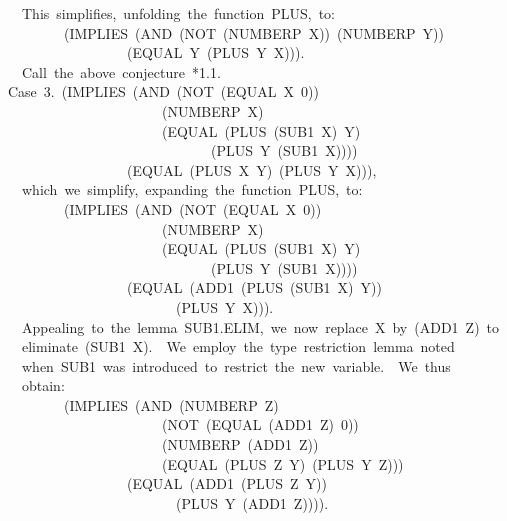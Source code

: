 \documentclass[11pt]{book}
\newenvironment{pubasis}{\begin{flushleft}\ttfamily\small}{\normalsize\rmfamily\end{flushleft}}
\begin{document}
\begin{pubasis}
~~This~simplifies,~unfolding~the~function~PLUS,~to:\\

~~~~~~~~(IMPLIES~(AND~(NOT~(NUMBERP~X))~(NUMBERP~Y))\\
~~~~~~~~~~~~~~~~~(EQUAL~Y~(PLUS~Y~X))).\\

~~Call~the~above~conjecture~*1.1.\\

Case~3.~(IMPLIES~(AND~(NOT~(EQUAL~X~0))\\
~~~~~~~~~~~~~~~~~~~~~~(NUMBERP~X)\\
~~~~~~~~~~~~~~~~~~~~~~(EQUAL~(PLUS~(SUB1~X)~Y)\\
~~~~~~~~~~~~~~~~~~~~~~~~~~~~~(PLUS~Y~(SUB1~X))))\\
~~~~~~~~~~~~~~~~~(EQUAL~(PLUS~X~Y)~(PLUS~Y~X))),\\

~~which~we~simplify,~expanding~the~function~PLUS,~to:\\

~~~~~~~~(IMPLIES~(AND~(NOT~(EQUAL~X~0))\\
~~~~~~~~~~~~~~~~~~~~~~(NUMBERP~X)\\
~~~~~~~~~~~~~~~~~~~~~~(EQUAL~(PLUS~(SUB1~X)~Y)\\
~~~~~~~~~~~~~~~~~~~~~~~~~~~~~(PLUS~Y~(SUB1~X))))\\
~~~~~~~~~~~~~~~~~(EQUAL~(ADD1~(PLUS~(SUB1~X)~Y))\\
~~~~~~~~~~~~~~~~~~~~~~~~(PLUS~Y~X))).\\

~~Appealing~to~the~lemma~SUB1.ELIM,~we~now~replace~X~by~(ADD1~Z)~to\\
~~eliminate~(SUB1~X).~~We~employ~the~type~restriction~lemma~noted\\
~~when~SUB1~was~introduced~to~restrict~the~new~variable.~~We~thus\\
~~obtain:\\

~~~~~~~~(IMPLIES~(AND~(NUMBERP~Z)\\
~~~~~~~~~~~~~~~~~~~~~~(NOT~(EQUAL~(ADD1~Z)~0))\\
~~~~~~~~~~~~~~~~~~~~~~(NUMBERP~(ADD1~Z))\\
~~~~~~~~~~~~~~~~~~~~~~(EQUAL~(PLUS~Z~Y)~(PLUS~Y~Z)))\\
~~~~~~~~~~~~~~~~~(EQUAL~(ADD1~(PLUS~Z~Y))\\
~~~~~~~~~~~~~~~~~~~~~~~~(PLUS~Y~(ADD1~Z)))).\\


\end{pubasis}
\end{document}
